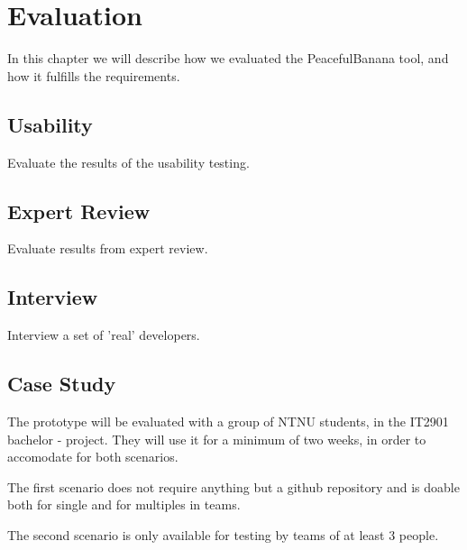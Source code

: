 \chapter{Evaluation}
In this chapter we will describe how we evaluated the PeacefulBanana tool, and how it fulfills the requirements.



\section{Usability}
Evaluate the results of the usability testing. 

\section{Expert Review}
Evaluate results from expert review. %

\section{Interview}
Interview a set of 'real' developers.

\section{Case Study}
The prototype will be evaluated with a group of NTNU students, in the IT2901 bachelor - project. They will use it for a minimum of two weeks, in order to accomodate for both scenarios.

The first scenario does not require anything but a github repository and is doable both for single and for multiples in teams.

The second scenario is only available for testing by teams of at least 3 people.
